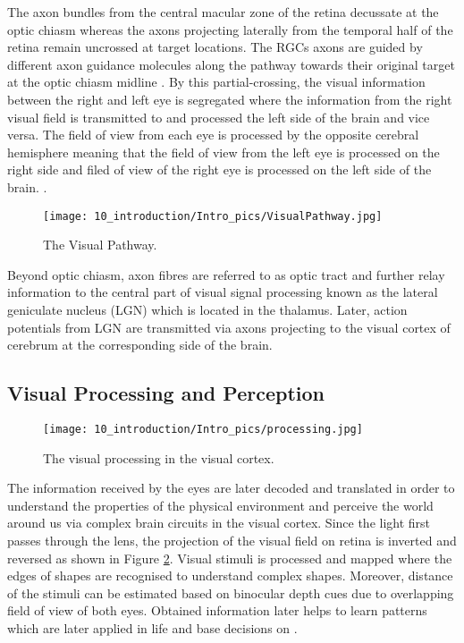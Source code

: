 The axon bundles from the central macular zone of the retina decussate at the optic chiasm whereas the axons projecting laterally from the temporal half of the retina remain uncrossed at target locations. The RGCs axons are guided by different axon guidance molecules along the pathway towards their original target at the optic chiasm midline \cite{holmes2018reconstructing}. By this partial-crossing, the visual information between the right and left eye is segregated where the information from the right visual field is transmitted to and processed the left side of the brain and vice versa. The field of view from each eye is processed by the opposite cerebral hemisphere meaning that the field of view from the left eye is processed on the right side and filed of view of the right eye is processed on the left side of the brain. \cite{holmes2018reconstructing}.

\begin{figure}[H]
\centering
\texttt{[image: 10\_introduction/Intro\_pics/VisualPathway.jpg]}
\caption{The Visual Pathway. \cite{openstax}}
\label{fig:The Visual Pathway}
\end{figure}

Beyond optic chiasm, axon fibres are referred to as optic tract and further relay information to the central part of visual signal processing known as the lateral geniculate nucleus (LGN) which is located in the thalamus. Later, action potentials from LGN are transmitted via axons projecting to the  visual cortex of cerebrum at the corresponding side of the brain. 

\subsection{Visual Processing and Perception}

\begin{figure}[H]
\centering
\texttt{[image: 10\_introduction/Intro\_pics/processing.jpg]}
\caption{The visual processing in the visual cortex. \cite{openstax}}
\label{fig:The Visual Processing}
\end{figure}

The information received by the eyes are later decoded and translated in order to understand the properties of the physical environment and perceive the world around us via complex brain circuits in the visual cortex. Since the light first passes through the lens, the projection of the visual field on retina is inverted and reversed as shown in Figure \ref{fig:The Visual Processing}. Visual stimuli is processed and mapped where the edges of shapes are recognised to understand complex shapes. Moreover, distance of the stimuli can be estimated based on binocular depth cues due to overlapping field of view of both eyes. Obtained information later helps to learn patterns which are later applied in life and base decisions on \cite{wandell2007visual}. 



